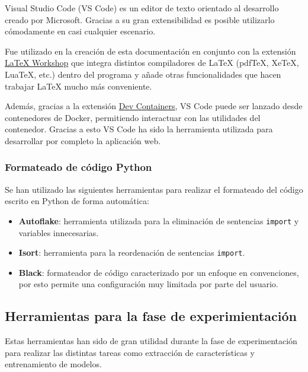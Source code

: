 Visual Studio Code (VS Code) es un editor de texto orientado al desarrollo
creado por Microsoft. Gracias a su gran extensibilidad es posible utilizarlo
cómodamente en casi cualquier escenario.

Fue utilizado en la creación de esta documentación en conjunto con la extensión
\href{https://github.com/James-Yu/LaTeX-Workshop}{\LaTeX{} Workshop} que integra
distintos compiladores de \LaTeX{} (pdfTeX, XeTeX, LuaTeX, etc.) dentro del
programa y añade otras funcionalidades que hacen trabajar \LaTeX{} mucho más
conveniente.

Además, gracias a la extensión
\href{https://marketplace.visualstudio.com/items?itemName=ms-vscode-remote.remote-containers}{Dev
Containers}, VS Code puede ser lanzado desde contenedores de Docker, permitiendo
interactuar con las utilidades del contenedor. Gracias a esto VS Code ha sido la
herramienta utilizada para desarrollar por completo la aplicación web.

\subsubsection{Formateado de código Python}

Se han utilizado las siguientes herramientas para realizar el formateado del
código escrito en Python de forma automática:

\begin{itemize}
      \item \textbf{Autoflake}: herramienta utilizada para la eliminación de
            sentencias \texttt{import} y variables innecesarias.
      \item \textbf{Isort}: herramienta para la reordenación de sentencias
            \texttt{import}.
      \item \textbf{Black}: formateador de código caracterizado por un enfoque
            en convenciones, por esto permite una configuración muy limitada por
            parte del usuario.
\end{itemize}

\subsection{Herramientas para la fase de experimientación}

Estas herramientas han sido de gran utilidad durante la fase de experimentación
para realizar las distintas tareas como extracción de características y
entrenamiento de modelos.

